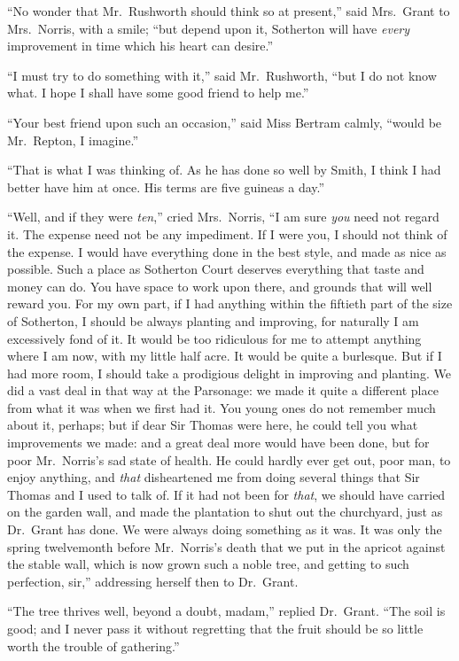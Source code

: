 \documentclass{article}
\begin{document}
``No wonder that Mr.\ Rushworth should think so at present,''
said Mrs.\ Grant to Mrs.\ Norris, with a smile; ``but depend
upon it, Sotherton will have \emph{every} improvement in time
which his heart can desire.''

``I must try to do something with it,'' said Mr.\ Rushworth,
``but I do not know what.  I hope I shall have some good
friend to help me.''

``Your best friend upon such an occasion,'' said Miss
Bertram calmly, ``would be Mr.\ Repton, I imagine.''

``That is what I was thinking of.  As he has done so
well by Smith, I think I had better have him at once.
His terms are five guineas a day.''

``Well, and if they were \emph{ten},'' cried Mrs.\ Norris,
``I am sure \emph{you} need not regard it.  The expense need
not be any impediment.  If I were you, I should not
think of the expense.  I would have everything done
in the best style, and made as nice as possible.
Such a place as Sotherton Court deserves everything that
taste and money can do.  You have space to work upon there,
and grounds that will well reward you.  For my own part,
if I had anything within the fiftieth part of the size
of Sotherton, I should be always planting and improving,
for naturally I am excessively fond of it.  It would be
too ridiculous for me to attempt anything where I am now,
with my little half acre.  It would be quite a burlesque.
But if I had more room, I should take a prodigious delight
in improving and planting.  We did a vast deal in that way
at the Parsonage:  we made it quite a different place
from what it was when we first had it.  You young ones
do not remember much about it, perhaps; but if dear Sir
Thomas were here, he could tell you what improvements
we made:  and a great deal more would have been done,
but for poor Mr.\ Norris's sad state of health.  He could
hardly ever get out, poor man, to enjoy anything, and \emph{that}
disheartened me from doing several things that Sir Thomas
and I used to talk of.  If it had not been for \emph{that},
we should have carried on the garden wall, and made the
plantation to shut out the churchyard, just as Dr.\ Grant
has done.  We were always doing something as it was.
It was only the spring twelvemonth before Mr.\ Norris's
death that we put in the apricot against the stable wall,
which is now grown such a noble tree, and getting
to such perfection, sir,'' addressing herself then to
Dr.\ Grant.

``The tree thrives well, beyond a doubt, madam,'' replied Dr.\ Grant.
``The soil is good; and I never pass it without regretting
that the fruit should be so little worth the trouble of gathering.''
\end{document}

